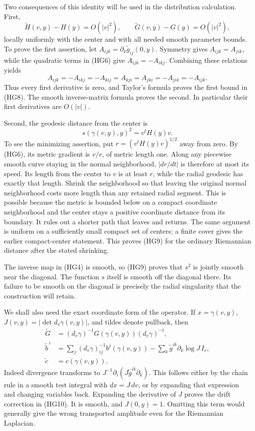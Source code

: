 \documentclass[
  11pt,
]{article}
\begin{document}
Two consequences of this identity will be used in the distribution
calculation. First, \[
 \widetilde H(v,y)-H(y)=O(|v|^2),\qquad
 \widetilde G(v,y)-G(y)=O(|v|^2),                               \tag{HG8}
\] locally uniformly with the center and with all needed smooth
parameter bounds. To prove the first assertion, let
\(A_{ijk}=\partial_k\widetilde g_{ij}(0,y)\). Symmetry gives
\(A_{ijk}=A_{jik}\), while the quadratic terms in (HG6) give
\(A_{ijk}=-A_{ikj}\). Combining these relations yields \[
 A_{ijk}=-A_{ikj}=-A_{kij}=A_{kji}=A_{jki}=-A_{jik}=-A_{ijk}.
\] Thus every first derivative is zero, and Taylor's formula proves the
first bound in (HG8). The smooth inverse-matrix formula proves the
second. In particular their first derivatives are \(O(|v|)\).

Second, the geodesic distance from the center is \[
 s(\gamma(v,y),y)^2=v^tH(y)v.                                  \tag{HG9}
\] To see the minimizing assertion, put \(r=(v^tH(y)v)^{1/2}\) away from
zero. By (HG6), its metric gradient is \(v/r\), of metric length one.
Along any piecewise smooth curve staying in the normal neighborhood,
\(|dr/dt|\) is therefore at most its speed. Its length from the center
to \(v\) is at least \(r\), while the radial geodesic has exactly that
length. Shrink the neighborhood so that leaving the original normal
neighborhood costs more length than any retained radial segment. This is
possible because the metric is bounded below on a compact coordinate
neighborhood and the center stays a positive coordinate distance from
its boundary. It rules out a shorter path that leaves and returns. The
same argument is uniform on a sufficiently small compact set of centers;
a finite cover gives the earlier compact-center statement. This proves
(HG9) for the ordinary Riemannian distance after the stated shrinking.

The inverse map in (HG4) is smooth, so (HG9) proves that \(s^2\) is
jointly smooth near the diagonal. The function \(s\) itself is smooth
off the diagonal there. Its failure to be smooth on the diagonal is
precisely the radial singularity that the construction will retain.

We shall also need the exact coordinate form of the operator. If
\(x=\gamma(v,y)\), \(J(v,y)=|\det d_v\gamma(v,y)|\), and tildes denote
pullback, then \[
\begin{split}
 \widetilde G&=(d_v\gamma)^{-1}G(\gamma(v,y))(d_v\gamma)^{-t},\\
 \widetilde b^{\,i}
   &=\sum_j(d_v\gamma)^{-1}_{ij}b^j(\gamma(v,y))
               -\sum_k\widetilde g^{ik}\partial_k\log J\,I_r,\\
 \widetilde c&=c(\gamma(v,y)).
\end{split}                                                       \tag{HG10}
\] Indeed divergence transforms to
\(J^{-1}\partial_i(J\widetilde g^{ik}\partial_k)\). This follows either
by the chain rule in a smooth test integral with \(dx=J\,dv\), or by
expanding that expression and changing variables back. Expanding the
derivative of \(J\) proves the drift correction in (HG10). It is smooth,
and \(J(0,y)=1\). Omitting this term would generally give the wrong
transported amplitude even for the Riemannian Laplacian.
\end{document}
